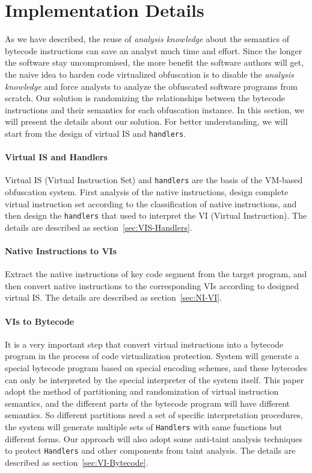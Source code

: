 \section{Implementation Details}\label{sec:overview}
As we have described, the reuse of \textit{analysis knowledge} about the semantics of bytecode instructions can save an analyst much time and effort. Since the longer the software stay uncompromised, the more benefit the software authors will get, the naive idea to harden code virtualized obfuscation is to disable the \textit{analysis knowledge} and force analysts to analyze the obfuscated software programs from scratch. Our solution is randomizing the relationships between the bytecode instructions and their semantics for each obfuscation instance. In this section, we will present the details about our solution. For better understanding, we will start from the design of virtual IS and \texttt{handlers}.

\paragraph{Virtual IS and Handlers}
Virtual IS (Virtual Instruction Set) and \texttt{handlers} are the basis of the VM-based obfuscation system. First analysis of the native instructions, design complete virtual instruction set according to the classification of native instructions, and then design the \texttt{handlers} that used to interpret the VI (Virtual Instruction). The details are described as section~\ref{sec:VIS-Handlers}.

\paragraph{Native Instructions to VIs}
Extract the native instructions of key code segment from the target program, and then convert native instructions to the corresponding VIs according to designed virtual IS. The details are described as section~\ref{sec:NI-VI}.

\paragraph{VIs to Bytecode}
It is a very important step that convert virtual instructions into a bytecode program in the process of code virtualization protection. System will generate a special bytecode program based on special encoding schemes, and these bytecodes can only be interpreted by the special interpreter of the system itself. This paper adopt the method of partitioning and randomization of virtual instruction semantics, and the different parts of the bytecode program will have different semantics. So different partitions need a set of specific interpretation procedures, the system will generate multiple sets of \texttt{Handlers} with same functions but different forms. Our approach will also adopt some anti-taint analysis techniques to protect \texttt{Handlers} and other components from taint analysis. The details are described as section~\ref{sec:VI-Bytecode}.


